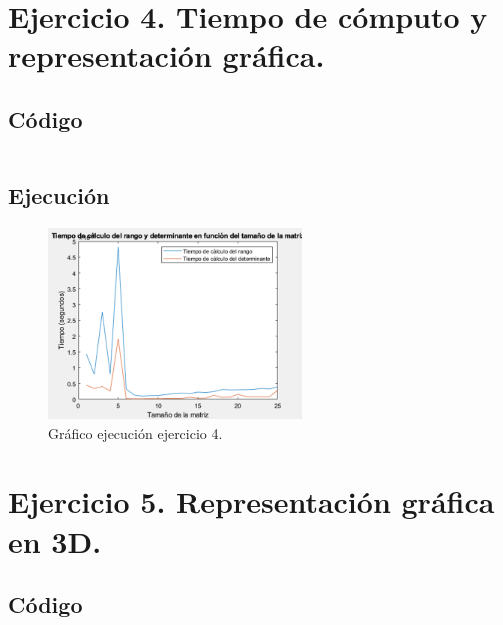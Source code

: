 \documentclass[a4paper, 12pt]{article}
\begin{document}
	\section{Ejercicio 4. Tiempo de cómputo y representación gráfica.}
	
	\subsection{Código}
	\inputminted[fontsize=\scriptsize, linenos, breaklines=true, xleftmargin=0.75cm, frame=lines]{matlab}{code/parte1/Ejercicio4.m}
	\subsection{Ejecución}
	\begin{figure}[htp!]
		\centering
		\includegraphics[width=0.6\textwidth]{figures/graf4.png}
		\caption{Gráfico ejecución ejercicio 4.}
	\end{figure}
	
	\section{Ejercicio 5. Representación gráfica en 3D.}
	
	\subsection{Código}
	\inputminted[fontsize=\scriptsize, linenos, breaklines=true, xleftmargin=0.75cm, frame=lines]{matlab}{code/parte1/Ejercicio5.m}
	\newpage
\end{document}
